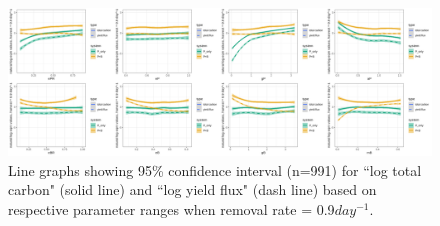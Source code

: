 \documentclass[../thesis.tex]{subfiles} %
\begin{document}
\begin{figure}[H]
    \centering
    \includegraphics[width=\linewidth]{../result/var_09.png}
    \caption[95\% distribution for $x=0.3day^{-1}$]{Line graphs showing 95\% confidence interval (n=991) for ``log total carbon" (solid line) and ``log yield flux" (dash line) based on respective parameter ranges when removal rate = 0.9$day^{-1}$.}
    \label{fig:v09}
\end{figure}
\end{document}

